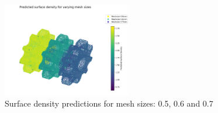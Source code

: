 \begin{figure}[H]
    \centering
    \includegraphics[width=0.5\textwidth]{figures/varying_meshsize_lowQ.png}
    \caption{Surface density predictions for mesh sizes: 0.5, 0.6 and 0.7}
    \label{fig:diff_mesh_predict}
\end{figure}
